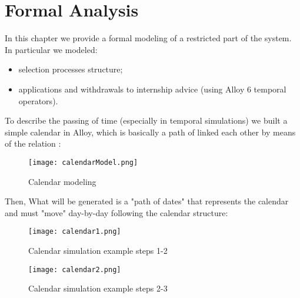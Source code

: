 \chapter{Formal Analysis}
	In this chapter we provide a formal modeling of a restricted part of the system. In particular we modeled:
	\begin{itemize}
		\item selection processes structure;
		\item applications and withdrawals to internship advice (using Alloy 6 temporal operators).
	\end{itemize}
	
	To describe the passing of time (especially in temporal simulations) we built a simple calendar in Alloy, which is basically a path of  linked each other by means of the relation :
	\begin{figure}[H]
		\centering
		\texttt{[image: calendarModel.png]}
		\caption{Calendar modeling}
	\end{figure}
	
	Then, What will be generated is a "path of dates" that represents the calendar and  must "move" day-by-day following the calendar structure:
	\begin{figure}[H]
		\centering
		\texttt{[image: calendar1.png]}
		\caption{Calendar simulation example steps 1-2}
	\end{figure}
	\begin{figure}[H]
		\centering
		\texttt{[image: calendar2.png]}
		\caption{Calendar simulation example steps 2-3}
	\end{figure}
	
